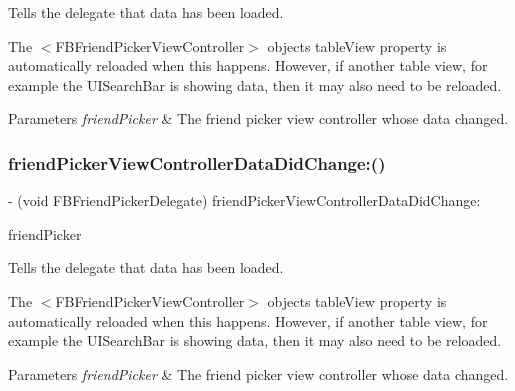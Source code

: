 Tells the delegate that data has been loaded.

The $<$\+F\+B\+Friend\+Picker\+View\+Controller$>$ object\textquotesingle{}s {\ttfamily table\+View} property is automatically reloaded when this happens. However, if another table view, for example the {\ttfamily U\+I\+Search\+Bar} is showing data, then it may also need to be reloaded.


\begin{DoxyParams}{Parameters}
{\em friend\+Picker} & The friend picker view controller whose data changed. \\
\hline
\end{DoxyParams}
\mbox{\label{protocolFBFriendPickerDelegate_01-p_adb573d4fc9792d3dc05298f13bc41086}} 
\subsubsection{\texorpdfstring{friend\+Picker\+View\+Controller\+Data\+Did\+Change\+:()}{friendPickerViewControllerDataDidChange:()}\hspace{0.1cm}{\footnotesize\ttfamily [4/5]}}
{\footnotesize\ttfamily -\/ (void F\+B\+Friend\+Picker\+Delegate) friend\+Picker\+View\+Controller\+Data\+Did\+Change\+: \begin{DoxyParamCaption}\item[{(\hyperlink{interfaceFBFriendPickerViewController}{F\+B\+Friend\+Picker\+View\+Controller} $\ast$)}]{friend\+Picker }\end{DoxyParamCaption}\hspace{0.3cm}{\ttfamily [optional]}}

Tells the delegate that data has been loaded.

The $<$\+F\+B\+Friend\+Picker\+View\+Controller$>$ object\textquotesingle{}s {\ttfamily table\+View} property is automatically reloaded when this happens. However, if another table view, for example the {\ttfamily U\+I\+Search\+Bar} is showing data, then it may also need to be reloaded.


\begin{DoxyParams}{Parameters}
{\em friend\+Picker} & The friend picker view controller whose data changed. \\
\hline
\end{DoxyParams}
\mbox{\label{protocolFBFriendPickerDelegate_01-p_adb573d4fc9792d3dc05298f13bc41086}} 
